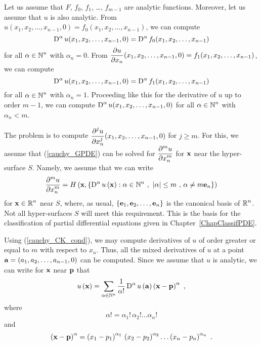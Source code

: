 Let us assume that $F$, $f_0$, $f_1$, \ldots , $f_{m-1}$ are analytic
functions.  Moreover, let us assume that $u$ is also analytic.
From $u(x_1,x_2, \ldots, x_{n-1},0) = f_0(x_1,x_2, \ldots, x_{n-1})$,
we can compute
\[
\operatorname{D}^\alpha u(x_1, x_2, \ldots, x_{n-1}, 0) =
\operatorname{D}^\alpha f_0(x_1, x_2, \ldots, x_{n-1})
\]
for all $\displaystyle \alpha \in \mathbb{N}^n$ with $\alpha_n = 0$.
From $\displaystyle \frac{\partial{u}}{\partial x_n}(x_1,x_2, \ldots, x_{n-1},0)
= f_1(x_1,x_2, \ldots, x_{n-1})$,
we can compute
\[
\operatorname{D}^\alpha u(x_1, x_2, \ldots, x_{n-1}, 0) =
\operatorname{D}^\alpha f_1(x_1, x_2, \ldots, x_{n-1})
\]
for all $\displaystyle \alpha \in \mathbb{N}^n$ with $\alpha_n = 1$.
Proceeding like this for the derivative of $u$ up to order $m-1$, we
can compute $\displaystyle \operatorname{D}^\alpha u(x_1, x_2, \ldots, x_{n-1}, 0)$ for
all $\displaystyle \alpha \in \mathbb{N}^n$ with $\alpha_n < m$.

The problem is to compute
$\displaystyle \frac{\displaystyle \partial^{j}{u}} {\displaystyle \partial x_n^{j}}(x_1,x_2,\ldots,x_{n-1},0)$ for $j\geq m$.
For this, we assume that (\ref{cauchy_GPDE}) can be solved for
$\displaystyle \frac{\displaystyle \partial^{m}{u}} {\displaystyle \partial x_n^{m}}$ for $\mathbf{x}$ near the hyper-surface $S$.
Namely, we assume that we can write
\begin{equation} \label{cauchy_CK_cond}
\displaystyle \pdydxn{u}{x_n}{m} = H\left(\VEC{x},
\left\{ \diff^\alpha u\left(\VEC{x}\right) : \alpha \in \NN^n \ , \ 
|\alpha| \leq m \ , \, \alpha \neq m \VEC{e}_n \right\} \right)
\end{equation}
for $\displaystyle \mathbf{x} \in \mathbb{R}^n$ near $S$, where, as usual,
$\displaystyle \left\{ \mathbf{e}_1, \mathbf{e}_2, \ldots, \mathbf{e}_n\right\}$ 
is the canonical basis of $\displaystyle \mathbb{R}^n$.  Not all
hyper-surfaces $S$ will meet this requirement.   This is the basis for
the classification of partial differential equations given in
Chapter~\ref{ChapClassifPDE}.

Using (\ref{cauchy_CK_cond}), we may compute derivatives of $u$ of
order greater or equal to $m$ with respect to $x_n$.  Thus, all the
mixed derivatives of $u$ at a point
$\mathbf{a} = (a_1,a_2, \ldots, a_{n-1}, 0)$
can be computed.  Since we assume that $u$ is analytic, we can write
for $\mathbf{x}$ near $\mathbf{p}$ that
\[
u\left(\mathbf{x}\right) =
\sum_{\alpha \in \mathbb{N}^n} \frac{1}{\alpha!}
\operatorname{D}^\alpha u\left(\mathbf{a}\right) \left( \mathbf{x}- \mathbf{p} \right)^\alpha \ ,
\]
where
\[
\alpha! = \alpha_1!\,\alpha_2!\ldots \alpha_n!
\]
and
\[
\left( \mathbf{x}- \mathbf{p} \right)^\alpha =
\left(x_1-p_1\right)^{\alpha_1}\,\left(x_2-p_2\right)^{\alpha_2}\ldots
\left(x_n-p_n\right)^{\alpha_n} \ .
\]

